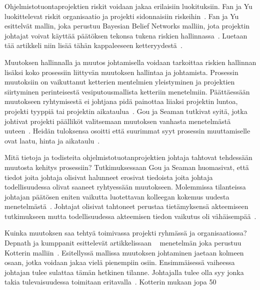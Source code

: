 \documentclass[finnish]{tktltiki2}
\theoremstyle{definition}
\theoremstyle{remark}
\begin{document}
Ohjelmistotuontaprojektien riskit voidaan jakaa erilaisiin luokituksiin. Fan ja Yu luokittelevat riskit organisaatio ja projekti sidonnaisiin riskeihin~\cite{fan2004bbn}. Fan ja Yu esittelvät mallin, joka perustuu Bayesian Belief Networks malliin, jota projektin johtajat voivat käyttää päätöksen tekonsa tukena riskien hallinnassa~\cite{fan2004bbn}. Luetaan tää artikkeli niin lisää tähän kappaleeseen ketteryydestä~\cite{szHokeproject}.

Muutoksen hallinnalla ja muutos johtamisella voidaan tarkoittaa riskien hallinnan lisäksi koko prosessiin liittyvän muutoksen hallintaa ja johtamista. Prosessin muutoksiin on vaikuttanut ketterien mentelmien yleistyminen ja projektien siirtyminen perinteisestä vesiputousmallista ketteriin menetelmiin. Päättäessään muutokseen ryhtymisestä ei johtjana pidä painottaa liiaksi projektin luntoa, projekti tyyppiä tai projektin aikataulua~\cite{Chow2008961}.  Gou ja Seaman tutkivat syitä, jotka johtivat projekti päälliköt valitsemaan muutoksen vanhasta menetelmästä uuteen~\cite{Guo:2008:SSP:1414004.1414046}. Heidän tuloksensa osoitti että suurimmat syyt prosessin muuttamiselle ovat laatu, hinta ja aikataulu~\cite{Guo:2008:SSP:1414004.1414046}. 

Mitä tietoja ja todisteita ohjelmistotuotanprojektien johtaja tahtovat tehdessään muutosta kehitys prosessiin? Tutkimuksessaan Gou ja Seaman huomasivat, että tiedot joita johtaja olisivat halunneet erosivat tiedoista joita johtaja todellisuudessa olivat saaneet ryhtyessään muutokseen. Molemmissa tilanteissa johtajan päätösen eniten vaikutta luotettavan kolleegan kokemus uudesta menetelmästä~\cite{Guo:2008:SSP:1414004.1414046}. Johtajat olisivat tahtoneet perustaa tietämyksensä akteemiseen tutkimukseen mutta todellisuudessa akteemisen tiedon vaikutus oli vähäisempää~\cite{Guo:2008:SSP:1414004.1414046}.

Kuinka muutoksen saa tehtyä toimivassa projekti ryhmässä ja organisaatiossa? Depnath ja kumppanit esittelevät artikkelissaan ~\cite{4017705} menetelmän joka perustuu Kotterin malliin~\cite{kotter1995leading}. Esitellyssä mallissa muutoksen johtaminen jaetaan kolmeen osaan, jotka voidaan jakaa vielä pienempiin osiin. Ensimmäisessä vaiheessa johtajan tulee sulattaa tämän hetkinen tilanne. Johtajalla tulee olla syy jonka takia tulevaisuudessa toimitaan eritavalla~\cite{4017705}. Kotterin mukaan jopa 50%
 
\end{document}
